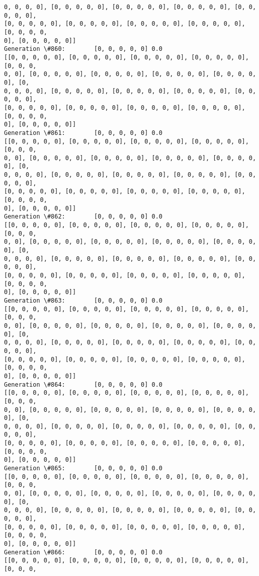 \documentclass[11pt]{article}
\begin{document}
\begin{Verbatim}[commandchars=\\\{\}]
0, 0, 0, 0], [0, 0, 0, 0, 0], [0, 0, 0, 0, 0], [0, 0, 0, 0, 0], [0, 0, 0, 0, 0],
[0, 0, 0, 0, 0], [0, 0, 0, 0, 0], [0, 0, 0, 0, 0], [0, 0, 0, 0, 0], [0, 0, 0, 0,
0], [0, 0, 0, 0, 0]]
Generation \#860:        [0, 0, 0, 0, 0] 0.0
[[0, 0, 0, 0, 0], [0, 0, 0, 0, 0], [0, 0, 0, 0, 0], [0, 0, 0, 0, 0], [0, 0, 0,
0, 0], [0, 0, 0, 0, 0], [0, 0, 0, 0, 0], [0, 0, 0, 0, 0], [0, 0, 0, 0, 0], [0,
0, 0, 0, 0], [0, 0, 0, 0, 0], [0, 0, 0, 0, 0], [0, 0, 0, 0, 0], [0, 0, 0, 0, 0],
[0, 0, 0, 0, 0], [0, 0, 0, 0, 0], [0, 0, 0, 0, 0], [0, 0, 0, 0, 0], [0, 0, 0, 0,
0], [0, 0, 0, 0, 0]]
Generation \#861:        [0, 0, 0, 0, 0] 0.0
[[0, 0, 0, 0, 0], [0, 0, 0, 0, 0], [0, 0, 0, 0, 0], [0, 0, 0, 0, 0], [0, 0, 0,
0, 0], [0, 0, 0, 0, 0], [0, 0, 0, 0, 0], [0, 0, 0, 0, 0], [0, 0, 0, 0, 0], [0,
0, 0, 0, 0], [0, 0, 0, 0, 0], [0, 0, 0, 0, 0], [0, 0, 0, 0, 0], [0, 0, 0, 0, 0],
[0, 0, 0, 0, 0], [0, 0, 0, 0, 0], [0, 0, 0, 0, 0], [0, 0, 0, 0, 0], [0, 0, 0, 0,
0], [0, 0, 0, 0, 0]]
Generation \#862:        [0, 0, 0, 0, 0] 0.0
[[0, 0, 0, 0, 0], [0, 0, 0, 0, 0], [0, 0, 0, 0, 0], [0, 0, 0, 0, 0], [0, 0, 0,
0, 0], [0, 0, 0, 0, 0], [0, 0, 0, 0, 0], [0, 0, 0, 0, 0], [0, 0, 0, 0, 0], [0,
0, 0, 0, 0], [0, 0, 0, 0, 0], [0, 0, 0, 0, 0], [0, 0, 0, 0, 0], [0, 0, 0, 0, 0],
[0, 0, 0, 0, 0], [0, 0, 0, 0, 0], [0, 0, 0, 0, 0], [0, 0, 0, 0, 0], [0, 0, 0, 0,
0], [0, 0, 0, 0, 0]]
Generation \#863:        [0, 0, 0, 0, 0] 0.0
[[0, 0, 0, 0, 0], [0, 0, 0, 0, 0], [0, 0, 0, 0, 0], [0, 0, 0, 0, 0], [0, 0, 0,
0, 0], [0, 0, 0, 0, 0], [0, 0, 0, 0, 0], [0, 0, 0, 0, 0], [0, 0, 0, 0, 0], [0,
0, 0, 0, 0], [0, 0, 0, 0, 0], [0, 0, 0, 0, 0], [0, 0, 0, 0, 0], [0, 0, 0, 0, 0],
[0, 0, 0, 0, 0], [0, 0, 0, 0, 0], [0, 0, 0, 0, 0], [0, 0, 0, 0, 0], [0, 0, 0, 0,
0], [0, 0, 0, 0, 0]]
Generation \#864:        [0, 0, 0, 0, 0] 0.0
[[0, 0, 0, 0, 0], [0, 0, 0, 0, 0], [0, 0, 0, 0, 0], [0, 0, 0, 0, 0], [0, 0, 0,
0, 0], [0, 0, 0, 0, 0], [0, 0, 0, 0, 0], [0, 0, 0, 0, 0], [0, 0, 0, 0, 0], [0,
0, 0, 0, 0], [0, 0, 0, 0, 0], [0, 0, 0, 0, 0], [0, 0, 0, 0, 0], [0, 0, 0, 0, 0],
[0, 0, 0, 0, 0], [0, 0, 0, 0, 0], [0, 0, 0, 0, 0], [0, 0, 0, 0, 0], [0, 0, 0, 0,
0], [0, 0, 0, 0, 0]]
Generation \#865:        [0, 0, 0, 0, 0] 0.0
[[0, 0, 0, 0, 0], [0, 0, 0, 0, 0], [0, 0, 0, 0, 0], [0, 0, 0, 0, 0], [0, 0, 0,
0, 0], [0, 0, 0, 0, 0], [0, 0, 0, 0, 0], [0, 0, 0, 0, 0], [0, 0, 0, 0, 0], [0,
0, 0, 0, 0], [0, 0, 0, 0, 0], [0, 0, 0, 0, 0], [0, 0, 0, 0, 0], [0, 0, 0, 0, 0],
[0, 0, 0, 0, 0], [0, 0, 0, 0, 0], [0, 0, 0, 0, 0], [0, 0, 0, 0, 0], [0, 0, 0, 0,
0], [0, 0, 0, 0, 0]]
Generation \#866:        [0, 0, 0, 0, 0] 0.0
[[0, 0, 0, 0, 0], [0, 0, 0, 0, 0], [0, 0, 0, 0, 0], [0, 0, 0, 0, 0], [0, 0, 0,

\end{Verbatim}
\end{document}
